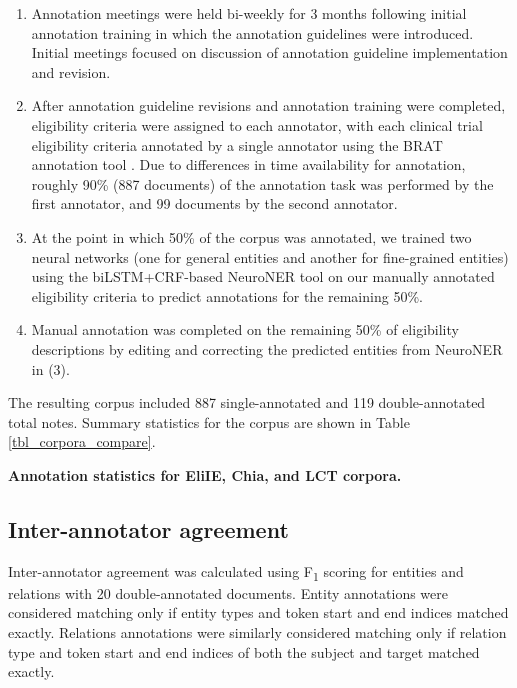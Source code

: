 \documentclass[../main.tex]{subfiles}
\begin{document}
\begin{enumerate}
    \item Annotation meetings were held bi-weekly for 3 months following initial annotation training in which the annotation guidelines were introduced. Initial meetings focused on discussion of annotation guideline implementation and revision.
    \item After annotation guideline revisions and annotation training were completed, eligibility criteria were assigned to each annotator, with each clinical trial eligibility criteria annotated by a single annotator using the BRAT annotation tool \cite{stenetorp2012brat}. Due to differences in time availability for annotation, roughly 90\% (887 documents) of the annotation task was performed by the first annotator, and 99 documents by the second annotator.
    \item At the point in which 50\% of the corpus was annotated, we trained two neural networks (one for general entities and another for fine-grained entities) using the biLSTM+CRF-based NeuroNER tool \cite{dernoncourt2017neuroner} on our manually annotated eligibility criteria to predict annotations for the remaining 50\%.
    \item Manual annotation was completed on the remaining 50\% of eligibility descriptions by editing and correcting the predicted entities from NeuroNER in (3).

\end{enumerate}    
    
The resulting corpus included 887 single-annotated and 119 double-annotated total notes. Summary statistics for the corpus are shown in Table \ref{tbl_corpora_compare}.

\begin{table}[h!]
  \small
  \centering
  
  \caption{\textbf{Annotation statistics for EliIE, Chia, and LCT corpora.}}
  \label{tbl_corpora_compare}
\end{table}

\subsection{Inter-annotator agreement}
Inter-annotator agreement was calculated using F\textsubscript{1} scoring for entities and relations with 20 double-annotated documents. Entity annotations were considered matching only if entity types and token start and end indices matched exactly. Relations annotations were similarly considered matching only if relation type and token start and end indices of both the subject and target matched exactly.
\end{document}
